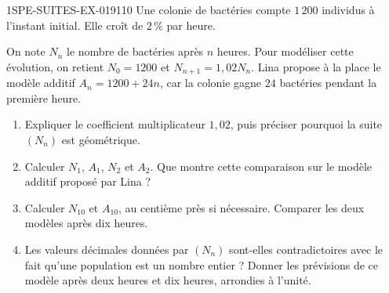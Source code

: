 \begin{exercice}{1SPE-SUITES-EX-019}{1}{10}
Une colonie de bactéries compte $1\,200$ individus à l'instant initial.
Elle croît de $2\,\%$ par heure.

On note $N_n$ le nombre de bactéries après $n$ heures.
Pour modéliser cette évolution, on retient $N_0=1200$ et
$N_{n+1}=1{,}02N_n$. Lina propose à la place le modèle additif
$A_n=1200+24n$, car la colonie gagne $24$ bactéries pendant la première heure.
\begin{enumerate}
  \item Expliquer le coefficient multiplicateur $1{,}02$, puis préciser pourquoi
  la suite $(N_n)$ est géométrique.
  \item Calculer $N_1$, $A_1$, $N_2$ et $A_2$. Que montre cette comparaison sur
  le modèle additif proposé par Lina ?
  \item Calculer $N_{10}$ et $A_{10}$, au centième près si nécessaire. Comparer
  les deux modèles après dix heures.
  \item Les valeurs décimales données par $(N_n)$ sont-elles contradictoires avec
  le fait qu'une population est un nombre entier ? Donner les prévisions de ce
  modèle après deux heures et dix heures, arrondies à l'unité.
\end{enumerate}
\end{exercice}
